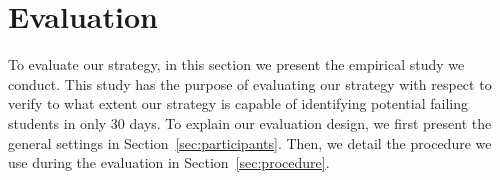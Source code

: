 \section{Evaluation}

\label{sec:evaluation}

To evaluate our strategy, in this section we present the empirical study we conduct. This study has the purpose of evaluating our strategy with respect to verify to what extent our strategy is capable of identifying potential failing students in only 30 days. To explain our evaluation design, we first present the general settings in Section~\ref{sec:participants}. Then, we detail the procedure we use during the evaluation in Section~\ref{sec:procedure}.


%
%
%






